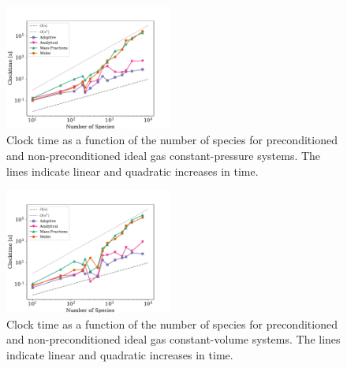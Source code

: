 \documentclass[twocolumn,10pt]{article}
\newcommand{\revised}[2]{#1}  %
\begin{document}
\begin{figure}[htb]
\centering
\includegraphics[width=0.49\textwidth]{figures/Clocktime-Nspecies-pressure_problem.pdf}
\caption{Clock time as a function of the number of species for preconditioned and non-preconditioned \revised{ideal gas constant-pressure systems}{revOne}.
The lines indicate linear and quadratic increases in time.}
\label{f:clocktime-nspecies-pressure}
\end{figure}

\begin{figure}[htb]
\centering
\includegraphics[width=0.49\textwidth]{figures/Clocktime-Nspecies-volume_problem.pdf}
\caption{Clock time as a function of the number of species for preconditioned and non-preconditioned \revised{ideal gas constant-volume systems}{revOne}.
The lines indicate linear and quadratic increases in time.}
\label{f:clocktime-nspecies-volume}
\end{figure}
\end{document}
